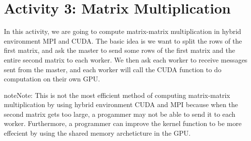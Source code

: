 \documentclass[letterpaper,10pt,openany,oneside]{sphinxmanual}
\begin{document}
\section{Activity 3: Matrix Multiplication}
\label{Activities/Activities:activity-3-matrix-multiplication}
In this activity, we are going to compute matrix-matrix multiplication in hybrid environment MPI and CUDA. The basic idea is we want to split the rows of the first matrix, and ask the master to send some rows of the first matrix and the entire second matrix to each worker. We then ask each worker to receive messages sent from the master, and each worker will call the CUDA function to do computation on their own GPU.

\begin{notice}{note}{Note:}
This is not the most efficient method of computing matrix-matrix multiplication by using hybrid environment CUDA and MPI because when the second matrix gets too large, a progammer may not be able to send it to each worker. Furthermore, a programmer can improve the kernel function to be more effecient by using the shared memory archeticture in the GPU.
\end{notice}
\end{document}
